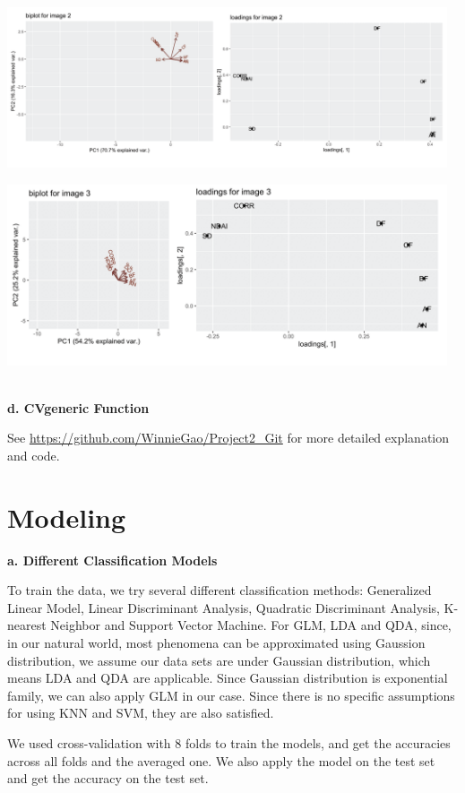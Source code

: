 \documentclass[11pt]{article}
\begin{document}
\includegraphics[width = 13cm]{2(c)pca2.png}

\includegraphics[width = 13cm]{2(c)pca3.png}

\vspace{0.3cm}
\mbox{}\\
\textbf{d. CVgeneric Function}

See \url{https://github.com/WinnieGao/Project2_Git} for more detailed explanation and code.



\section{Modeling}

\vspace{0.2cm}
\textbf{a. Different Classification Models}

To train the data, we try several different classification methods: Generalized Linear Model, Linear Discriminant Analysis, Quadratic Discriminant Analysis, K-nearest Neighbor and Support Vector Machine.
For GLM, LDA and QDA, since, in our natural world, most phenomena can be approximated using Gaussion distribution, we assume our data sets are under Gaussian distribution, which means LDA and QDA are applicable. Since Gaussian distribution is exponential family, we can also apply GLM in our case. Since there is no specific assumptions for using KNN and SVM, they are also satisfied.

We used cross-validation with 8 folds to train the models, and get the accuracies across all folds and the averaged one. We also apply the model on the test set and get the accuracy on the test set.
\end{document}
